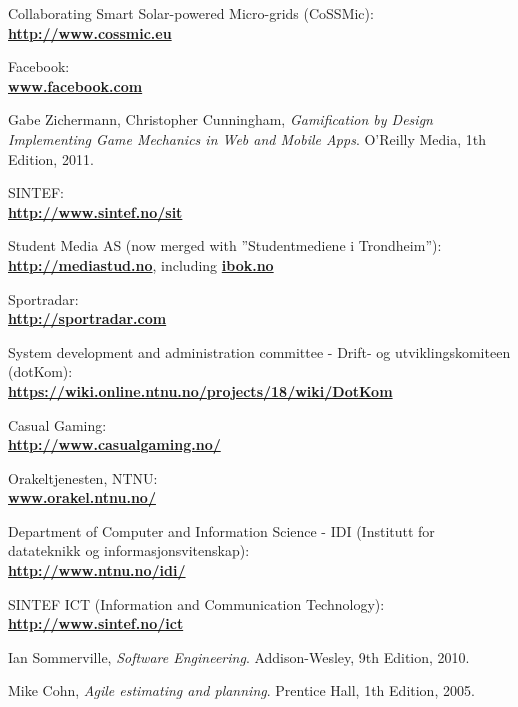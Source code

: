 \begin{thebibliography}{1}

 Collaborating Smart Solar-powered Micro-grids (CoSSMic):\\ \textbf{\url{http://www.cossmic.eu}}

 Facebook: \\
\textbf{ \url{www.facebook.com}}

  Gabe Zichermann, Christopher Cunningham,
  \emph{
Gamification by Design\\
Implementing Game Mechanics in Web and Mobile Apps}.
  O'Reilly Media,
  1th Edition,
  2011.

 SINTEF: \\
\textbf{ \url{ http://www.sintef.no/sit}}

 Student Media AS (now merged with ''Studentmediene i Trondheim''):\\
\textbf{ \url{http://mediastud.no}}, including \textbf{ \url{ibok.no}}

 Sportradar:\\
\textbf{ \url{http://sportradar.com}}

 System development and administration committee - Drift- og utviklingskomiteen (dotKom):\\
\textbf{ \url{https://wiki.online.ntnu.no/projects/18/wiki/DotKom}}

 Casual Gaming:\\
\textbf{ \url{http://www.casualgaming.no/}}

 Orakeltjenesten, NTNU:\\
\textbf{ \url{www.orakel.ntnu.no/}}

 Department of Computer and Information Science - IDI (Institutt for datateknikk og informasjonsvitenskap):\\
\textbf{ \url{http://www.ntnu.no/idi/}}

 SINTEF ICT (Information and Communication Technology): \\
\textbf{ \url{http://www.sintef.no/ict}}

  Ian Sommerville,
  \emph{Software Engineering}.
  Addison-Wesley,
  9th Edition,
  2010.

  Mike Cohn,
  \emph{Agile estimating and planning}.
  Prentice Hall,
  1th Edition,
  2005.
  

\end{thebibliography}
